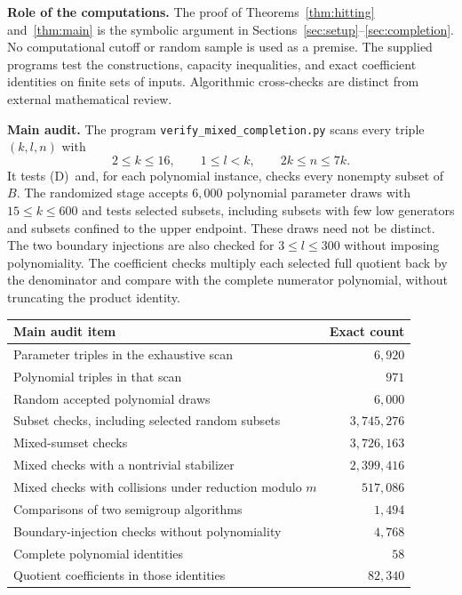 \documentclass[11pt,a4paper]{article}
\numberwithin{equation}{section}
\theoremstyle{remark}
\newcommand{\Dcond}{\textup{(D)}}
\newcommand{\code}[1]{\texttt{\small #1}}
\begin{document}
\textbf{Role of the computations.}
The proof of Theorems~\ref{thm:hitting} and~\ref{thm:main} is the
symbolic argument in Sections~\ref{sec:setup}--\ref{sec:completion}.
No computational cutoff or random sample is used as a premise.
The supplied programs test the constructions, capacity inequalities,
and exact coefficient identities on finite sets of inputs.
Algorithmic cross-checks are distinct from external mathematical review.

\textbf{Main audit.}
The program \code{verify\_mixed\_completion.py} scans every triple
$(k,l,n)$ with
\[
  2\le k\le16,\qquad 1\le l<k,\qquad 2k\le n\le7k.
\]
It tests \Dcond\ and, for each polynomial instance, checks every
nonempty subset of $B$.
The randomized stage accepts $6{,}000$ polynomial parameter draws
with $15\le k\le600$ and tests selected subsets, including subsets
with few low generators and subsets confined to the upper endpoint.
These draws need not be distinct.
The two boundary injections are also checked for $3\le l\le300$
without imposing polynomiality.
The coefficient checks multiply each selected full quotient back by
the denominator and compare with the complete numerator polynomial,
without truncating the product identity.

\begin{center}
\small
\begin{tabularx}{\textwidth}{@{}Xr@{}}
\toprule
\textbf{Main audit item} & \textbf{Exact count}\\
\midrule
Parameter triples in the exhaustive scan & $6{,}920$\\
Polynomial triples in that scan & $971$\\
Random accepted polynomial draws & $6{,}000$\\
Subset checks, including selected random subsets & $3{,}745{,}276$\\
Mixed-sumset checks & $3{,}726{,}163$\\
Mixed checks with a nontrivial stabilizer & $2{,}399{,}416$\\
Mixed checks with collisions under reduction modulo $m$ & $517{,}086$\\
Comparisons of two semigroup algorithms & $1{,}494$\\
Boundary-injection checks without polynomiality & $4{,}768$\\
Complete polynomial identities & $58$\\
Quotient coefficients in those identities & $82{,}340$\\
\bottomrule
\end{tabularx}
\end{center}
\end{document}
